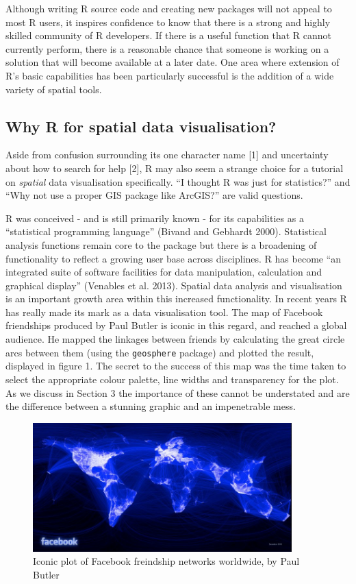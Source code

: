 \documentclass[]{article}
\let\Oldincludegraphics\includegraphics
\renewcommand{\includegraphics}[1]{\Oldincludegraphics[width=10cm]{#1}}
\begin{document}
Although writing R source code and creating new packages will not appeal
to most R users, it inspires confidence to know that there is a strong
and highly skilled community of R developers. If there is a useful
function that R cannot currently perform, there is a reasonable chance
that someone is working on a solution that will become available at a
later date. One area where extension of R's basic capabilities has been
particularly successful is the addition of a wide variety of spatial
tools.

\subsection{Why R for spatial data visualisation?}

Aside from confusion surrounding its one character name {[}1{]} and
uncertainty about how to search for help {[}2{]}, R may also seem a
strange choice for a tutorial on \emph{spatial} data visualisation
specifically. ``I thought R was just for statistics?'' and ``Why not use
a proper GIS package like ArcGIS?'' are valid questions.

R was conceived - and is still primarily known - for its capabilities as
a ``statistical programming language'' (Bivand and Gebhardt 2000).
Statistical analysis functions remain core to the package but there is a
broadening of functionality to reflect a growing user base across
disciplines. R has become ``an integrated suite of software facilities
for data manipulation, calculation and graphical display'' (Venables et
al. 2013). Spatial data analysis and visualisation is an important
growth area within this increased functionality. In recent years R has
really made its mark as a data visualisation tool. The map of Facebook
friendships produced by Paul Butler is iconic in this regard, and
reached a global audience. He mapped the linkages between friends by
calculating the great circle arcs between them (using the
\texttt{geosphere} package) and plotted the result, displayed in figure
1. The secret to the success of this map was the time taken to select
the appropriate colour palette, line widths and transparency for the
plot. As we discuss in Section 3 the importance of these cannot be
understated and are the difference between a stunning graphic and an
impenetrable mess.

\begin{figure}[htbp]
\centering
\includegraphics{figure/butler_facebook_2.jpg}
\caption{Iconic plot of Facebook freindship networks worldwide, by Paul
Butler}
\end{figure}
\end{document}
